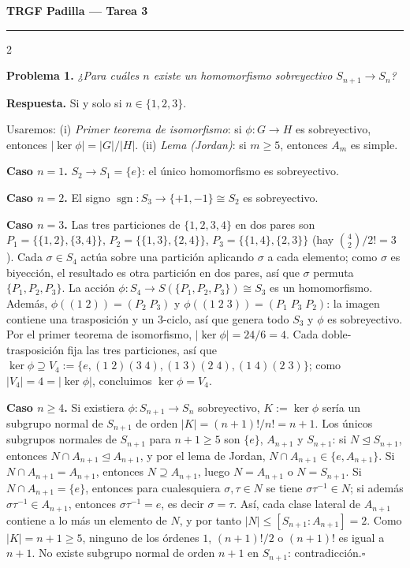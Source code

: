 \documentclass[8pt,a4paper]{extarticle}
\newcommand{\prob}[1]{%
  \par\vspace{0.5em}
  {\normalsize\bfseries\color{repblue} Problema #1.}\;%
}
\begin{document}
\begin{center}
{\large\bfseries\color{repblue} TRGF Padilla --- Tarea 3}
\end{center}
\vspace{-0.4em}
{\color{repblue}\rule{\linewidth}{0.6pt}}

\begin{multicols}{2}
\raggedcolumns

\prob{1}%
\textit{¿Para cuáles $n$ existe un homomorfismo sobreyectivo $S_{n+1}\to S_n$?}

\smallskip
\textbf{Respuesta.} Si y solo si $n\in\{1,2,3\}$.

Usaremos: (i) \emph{Primer teorema de isomorfismo}: si $\phi\colon G\to H$ es sobreyectivo, entonces $|\ker\phi|=|G|/|H|$.
(ii) \emph{Lema (Jordan)}: si $m\ge 5$, entonces $A_m$ es simple.

\textbf{Caso $n=1$.} $S_2\to S_1=\{e\}$: el único homomorfismo es sobreyectivo.

\textbf{Caso $n=2$.} El signo $\operatorname{sgn}\colon S_3\to\{+1,-1\}\cong S_2$ es sobreyectivo.

\textbf{Caso $n=3$.}
Las tres particiones de $\{1,2,3,4\}$ en dos pares son
$P_1=\bigl\{\{1,2\},\{3,4\}\bigr\}$,
$P_2=\bigl\{\{1,3\},\{2,4\}\bigr\}$,
$P_3=\bigl\{\{1,4\},\{2,3\}\bigr\}$
(hay $\binom{4}{2}/2!=3$).
Cada $\sigma\in S_4$ actúa sobre una partición aplicando $\sigma$ a cada elemento;
como $\sigma$ es biyección, el resultado es otra partición en dos pares,
así que $\sigma$ permuta $\{P_1,P_2,P_3\}$.
La acción $\phi\colon S_4\to S(\{P_1,P_2,P_3\})\cong S_3$ es un homomorfismo.
Además, $\phi((1\;2))=(P_2\;P_3)$ y $\phi((1\;2\;3))=(P_1\;P_3\;P_2)$:
la imagen contiene una trasposición y un $3$-ciclo, así que genera todo $S_3$ y $\phi$ es sobreyectivo.
Por el primer teorema de isomorfismo, $|\ker\phi|=24/6=4$.
Cada doble-trasposición fija las tres particiones, así que $\ker\phi\supseteq V_4:=\{e,(1\;2)(3\;4),(1\;3)(2\;4),(1\;4)(2\;3)\}$; como $|V_4|=4=|\ker\phi|$, concluimos $\ker\phi=V_4$.

\textbf{Caso $n\ge 4$.}
Si existiera $\phi\colon S_{n+1}\to S_n$ sobreyectivo, $K:=\ker\phi$ sería un subgrupo normal de $S_{n+1}$ de orden $|K|=(n+1)!/n!=n+1$.
Los únicos subgrupos normales de $S_{n+1}$ para $n+1\ge 5$ son $\{e\}$, $A_{n+1}$ y $S_{n+1}$:
si $N\trianglelefteq S_{n+1}$, entonces $N\cap A_{n+1}\trianglelefteq A_{n+1}$, y por el lema de Jordan, $N\cap A_{n+1}\in\{e, A_{n+1}\}$.
Si $N\cap A_{n+1}=A_{n+1}$, entonces $N\supseteq A_{n+1}$, luego $N=A_{n+1}$ o $N=S_{n+1}$.
Si $N\cap A_{n+1}=\{e\}$, entonces para cualesquiera $\sigma,\tau\in N$ se tiene $\sigma\tau^{-1}\in N$; si además $\sigma\tau^{-1}\in A_{n+1}$, entonces $\sigma\tau^{-1}=e$, es decir $\sigma=\tau$. Así, cada clase lateral de $A_{n+1}$ contiene a lo más un elemento de $N$, y por tanto $|N|\le [S_{n+1}:A_{n+1}]=2$.
Como $|K|=n+1\ge 5$, ninguno de los órdenes $1$, $(n+1)!/2$ o $(n+1)!$ es igual a $n+1$.
No existe subgrupo normal de orden $n+1$ en $S_{n+1}$: contradicción.\hfill$\square$


\end{multicols}
\end{document}
